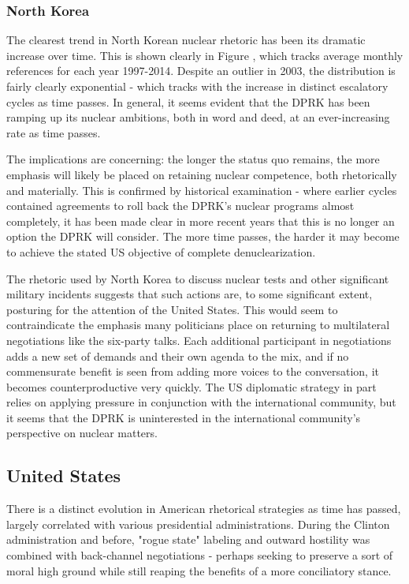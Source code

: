 \documentclass{article}
\begin{document}
\subsubsection{North Korea}

The clearest trend in North Korean nuclear rhetoric has been its dramatic increase over time. This is shown clearly in Figure , which tracks average monthly references for each year 1997-2014. Despite an outlier in 2003, the distribution is fairly clearly exponential - which tracks with the increase in distinct escalatory cycles as time passes. In general, it seems evident that the DPRK has been ramping up its nuclear ambitions, both in word and deed, at an ever-increasing rate as time passes.

The implications are concerning: the longer the status quo remains, the more emphasis will likely be placed on retaining nuclear competence, both rhetorically and materially. This is confirmed by historical examination - where earlier cycles contained agreements to roll back the DPRK's nuclear programs almost completely, it has been made clear in more recent years that this is no longer an option the DPRK will consider. The more time passes, the harder it may become to achieve the stated US objective of complete denuclearization.

The rhetoric used by North Korea to discuss nuclear tests and other significant military incidents suggests that such actions are, to some significant extent, posturing for the attention of the United States. This would seem to contraindicate the emphasis many politicians place on returning to multilateral negotiations like the six-party talks. Each additional participant in negotiations adds a new set of demands and their own agenda to the mix, and if no commensurate benefit is seen from adding more voices to the conversation, it becomes counterproductive very quickly. The US diplomatic strategy in part relies on applying pressure in conjunction with the international community, but it seems that the DPRK is uninterested in the international community's perspective on nuclear matters.

\subsection{United States}
There is a distinct evolution in American rhetorical strategies as time has passed, largely correlated with various presidential administrations. During the Clinton administration and before, "rogue state" labeling and outward hostility was combined with back-channel negotiations - perhaps seeking to preserve a sort of moral high ground while still reaping the benefits of a more conciliatory stance.
\end{document}
